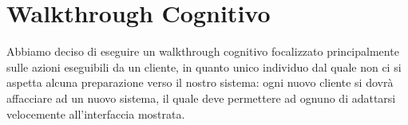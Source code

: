 \newcommand{\cognitivetable}[5]{%
	\begin{center}
		\renewcommand{\arraystretch}{1.5}
		\begin{tabularx}{\linewidth}{|X|X|}
			\hline 
			\textbf{#1} & \textbf{Osservazioni}
			\\ \hline
			\textbf{1. L'utente sa cosa deve ottenere con l'azione?} (sa cosa deve fare?) & #2 \\ \hline
			\textbf{2. L'utente può individuare lo strumento di interazione?} & #3 \\ \hline
			\textbf{3. L'utente può anche capire che quello è lo strumento giusto per fare ciò che vuol fare?} & #4 \\ \hline
			\textbf{4. Dopo che l'azione è eseguita, l'utente capisce la risposta che ottiene?} & #5 \\ \hline
		\end{tabularx}
	\end{center}
}
\newcommand{\tabellaProblemi}[6]{
	\noindent
	\begin{tabularx}{\textwidth}{|X|}
		\hline
		\begin{minipage}[t]{\linewidth}\raggedright
			\vspace{4pt}
			\textbf{Problema N\textsuperscript{o}:} #1 \hfill \textbf{Grado di Severità:} #5\\[4pt]
			\textbf{Azione:} #2\\[6pt]
			\textbf{Domanda:} \par
			#3\\[6pt]
			\textbf{Descrizione:} \par
			#4
			\vspace{6pt}
		\end{minipage} \\ \hline
		
		\begin{minipage}[t]{\linewidth}\centering
			\vspace{4pt}
			\textbf{Screenshot:}
			\vspace{0.6em}
			
			#6
			\vspace{6pt}
		\end{minipage} \\ \hline
	\end{tabularx}
	\vspace{1em}
}


\section{Walkthrough Cognitivo}
Abbiamo deciso di eseguire un walkthrough cognitivo focalizzato principalmente sulle azioni eseguibili da un cliente, in quanto unico individuo dal quale non ci si aspetta alcuna preparazione verso il nostro sistema: ogni nuovo cliente si dovrà affacciare ad un nuovo sistema, il quale deve permettere ad ognuno di adattarsi velocemente all'interfaccia mostrata.

